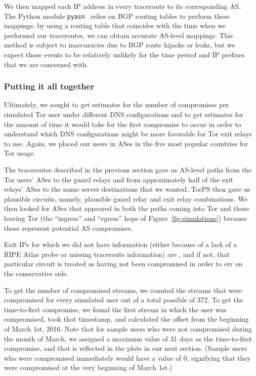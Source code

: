 \noindent
We then mapped each IP address in every traceroute to its corresponding
AS.  The Python module {\tt pyasn}~\cite{pyasn} relies on BGP routing tables to
perform these mappings; by using a routing table that coincides with the
time when we performed our traceroutes, we can obtain accurate AS-level
mappings.  This method is subject to inaccuracies due to BGP route
hijacks or leaks, but we expect those events to be relatively unlikely
for the time period and IP prefixes that we are concerned with.

\subsubsection{Putting it all together}
Ultimately, we sought to get estimates for the number of compromises per 
simulated Tor user under different DNS configurations and to get estimates 
for the amount of time it would take for the first compromise to occur 
in order to understand which DNS configurations 
might be more favorable for Tor exit relays to use. Again, we placed our users in 
ASes in the five most popular countries for Tor usage.

The traceroutes described in the previous section gave us AS-level paths from 
the Tor users' ASes to the guard relays and from approximately half of the exit 
relays' ASes to the name server destinations that we wanted. TorPS then gave us plausible 
circuits, namely, plausible guard relay and exit relay combinations. We then 
looked for ASes that appeared in both the paths coming into Tor and those 
leaving Tor (the ``ingress'' and ``egress'' hops of Figure~\ref{fig:simulations}) 
because those represent potential AS compromises.

Exit IPs for which we did not have information (either because of a lack of a 
RIPE Atlas probe or missing traceroute information) are , and if not, that 
particular circuit is treated as having not been compromised in order to err on the 
conservative side. 

To get the number of compromised streams, we counted the streams that were compromised 
for every simulated user out of a total possible of 372. To get the time-to-first compromise, 
we found the first stream in which the user was compromised, took that timestamp, and 
calculated the offset from the beginning of March 1st, 2016. Note that for sample users 
who were not compromised during the month of March, we assigned a maximum value 
of 31 days as the time-to-first compromise, and that is reflected in the plots in our 
next section. (Sample users who were compromised immediately would have a value of 0, 
signifying that they were compromised at the very beginning of March 1st.)

